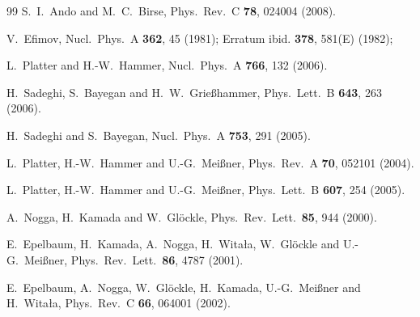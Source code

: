 \documentclass[aps,rmp,nofootinbib,twocolumn,floatfix]{revtex4}
\begin{document}
\begin{thebibliography}{99}
  S.~I.~Ando and M.~C.~Birse,
  Phys.\ Rev.\  C {\bf 78}, 024004 (2008).


V.~Efimov,
Nucl.\ Phys.\ A {\bf 362}, 45 (1981); 
Erratum ibid. {\bf 378}, 581(E) (1982); 

  L.~Platter and H.-W.~Hammer,
  Nucl.\ Phys.\  A {\bf 766}, 132 (2006).

  H.~Sadeghi, S.~Bayegan and H.~W.~Grie{\ss}hammer,
  Phys.\ Lett.\ B {\bf 643}, 263 (2006).

  H.~Sadeghi and S.~Bayegan,
 Nucl.\ Phys.\ A {\bf 753}, 291 (2005). 


  L.~Platter, H.-W.~Hammer and U.-G.~Mei\ss ner,
  Phys.\ Rev.\  A {\bf 70}, 052101 (2004).

  L.~Platter, H.-W.~Hammer and U.-G.~Mei\ss ner,
  Phys.\ Lett.\  B {\bf 607}, 254 (2005).


  A.~Nogga, H.~Kamada and W.~Gl\"ockle,
  Phys.\ Rev.\ Lett.\  {\bf 85}, 944 (2000).


  E.~Epelbaum, H.~Kamada, A.~Nogga, H.~Wita{\l}a, W.~Gl\"ockle and U.-G.~Mei\ss ner,
  Phys.\ Rev.\ Lett.\  {\bf 86}, 4787 (2001).

  E.~Epelbaum, A.~Nogga, W.~Gl\"ockle, H.~Kamada, U.-G.~Mei{\ss}ner and H.~Wita{\l}a, 
  Phys.\ Rev.\  C {\bf 66}, 064001 (2002).


\end{thebibliography}
\end{document}
